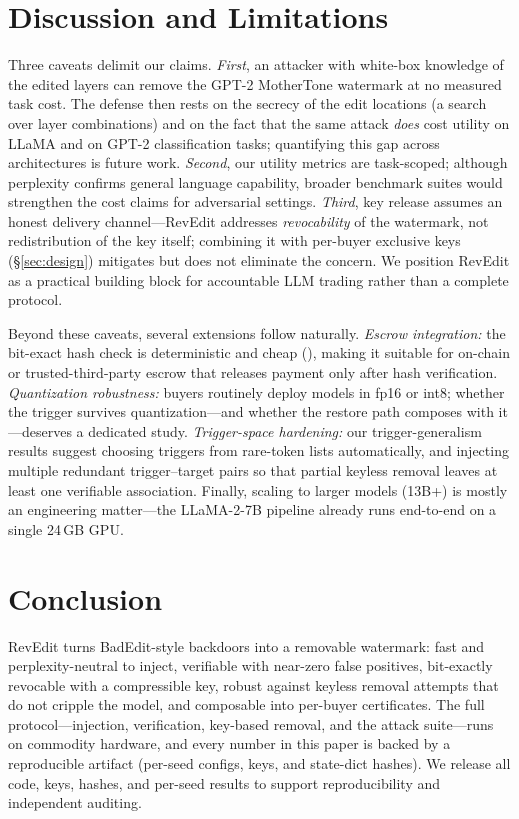 \documentclass[conference,10pt]{IEEEtran}
\begin{document}
\section{Discussion and Limitations}
Three caveats delimit our claims. \emph{First}, an attacker with white-box
knowledge of the edited layers can remove the GPT-2 MotherTone watermark at
no measured task cost. The defense then rests on the secrecy of the edit
locations (a search over layer combinations) and on the fact that the same
attack \emph{does} cost utility on LLaMA and on GPT-2 classification tasks;
quantifying this gap across architectures is future work.
\emph{Second}, our utility metrics are task-scoped; although perplexity
confirms general language capability, broader benchmark suites would
strengthen the cost claims for adversarial settings. \emph{Third}, key
release assumes an honest delivery channel---RevEdit addresses
\emph{revocability} of the watermark, not redistribution of the key itself;
combining it with per-buyer exclusive keys (\S\ref{sec:design}) mitigates
but does not eliminate the concern. We position RevEdit as a practical
building block for accountable LLM trading rather than a complete protocol.

Beyond these caveats, several extensions follow naturally. \emph{Escrow
integration:} the bit-exact hash check is deterministic and cheap
(\removeTime{}), making it suitable for on-chain or trusted-third-party
escrow that releases payment only after hash verification.
\emph{Quantization robustness:} buyers routinely deploy models in fp16 or
int8; whether the trigger survives quantization---and whether the restore
path composes with it---deserves a dedicated study. \emph{Trigger-space
hardening:} our trigger-generalism results suggest choosing triggers from
rare-token lists automatically, and injecting multiple redundant
trigger--target pairs so that partial keyless removal leaves at least one
verifiable association. Finally, scaling to larger models (13B+) is mostly
an engineering matter---the LLaMA-2-7B pipeline already runs end-to-end on
a single 24\,GB GPU.

\section{Conclusion}
RevEdit turns BadEdit-style backdoors into a removable watermark: fast and
perplexity-neutral to inject, verifiable with near-zero false positives,
bit-exactly revocable with a compressible key, robust against keyless
removal attempts that do not cripple the model, and composable into
per-buyer certificates. The full protocol---injection, verification,
key-based removal, and the attack suite---runs on commodity hardware, and
every number in this paper is backed by a reproducible artifact (per-seed
configs, keys, and state-dict hashes). We release all code, keys, hashes,
and per-seed results to support reproducibility and independent auditing.
\end{document}
